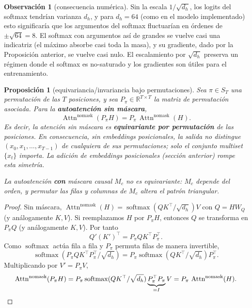 \documentclass[11pt]{report}
\newenvironment{tcolorbox}[1][]{\par\medskip\noindent\ignorespaces}{\par\medskip}
\theoremstyle{definition}
\newtheorem{observacion}[definicion]{Observación}
\theoremstyle{plain}
\newtheorem{proposicion}[definicion]{Proposición}
\numberwithin{equation}{section}
\newcommand{\R}{\mathbb{R}}
\newcommand{\softmax}{\operatorname{softmax}}
\newcommand{\Attn}{\operatorname{Attn}}
\begin{document}
\begin{observacion}[consecuencia numérica]
Sin la escala \(1/\sqrt{d_h}\), los logits del softmax tendrían varianza \(d_h\), y para \(d_h=64\) (como en el modelo implementado) esto significaría que los argumentos del softmax fluctuarían en órdenes de \(\pm\sqrt{64}=8\). El softmax con argumentos así de grandes se vuelve casi una indicatriz (el máximo absorbe casi toda la masa), y su gradiente, dado por la Proposición anterior, se vuelve casi nulo. El escalamiento por \(\sqrt{d_h}\) preserva un régimen donde el softmax es no-saturado y los gradientes son útiles para el entrenamiento.
\end{observacion}

\begin{tcolorbox}[colback=blue!8, colframe=blue!8, boxrule=0pt]
\begin{proposicion}[equivariancia/invariancia bajo permutaciones]
Sea \(\pi\in S_T\) una permutación de las \(T\) posiciones, y sea \(P_\pi\in\R^{T\times T}\) la matriz de permutación asociada. Para la \textbf{autoatención sin máscara},
\begin{equation*}
    \Attn^{\mathrm{nomask}}(P_\pi H)=P_\pi\,\Attn^{\mathrm{nomask}}(H).
\end{equation*}
Es decir, la atención sin máscara es \textbf{equivariante por permutación} de las posiciones. En consecuencia, sin embeddings posicionales, la salida no distingue \((x_0,x_1,\ldots,x_{T-1})\) de cualquiera de sus permutaciones; solo el conjunto multiset \(\{x_t\}\) importa. La adición de embeddings posicionales (sección anterior) rompe esta simetría.

La autoatención \textbf{con} máscara causal \(M_c\) no es equivariante: \(M_c\) depende del orden, y permutar las filas y columnas de \(M_c\) altera el patrón triangular.
\end{proposicion}
\end{tcolorbox}

\begin{proof}
Sin máscara, \(\Attn^{\mathrm{nomask}}(H)=\softmax(QK^\top/\sqrt{d_h})V\) con \(Q=HW_Q\) (y análogamente \(K,V\)). Si reemplazamos \(H\) por \(P_\pi H\), entonces \(Q\) se transforma en \(P_\pi Q\) (y análogamente \(K,V\)). Por tanto
\begin{equation*}
    Q'(K')^\top = P_\pi Q K^\top P_\pi^\top.
\end{equation*}
Como \(\softmax\) actúa fila a fila y \(P_\pi\) permuta filas de manera invertible,
\begin{equation*}
    \softmax(P_\pi QK^\top P_\pi^\top/\sqrt{d_h})
    =
    P_\pi\softmax(QK^\top/\sqrt{d_h})P_\pi^\top.
\end{equation*}
Multiplicando por \(V'=P_\pi V\),
\begin{equation*}
    \Attn^{\mathrm{nomask}}(P_\pi H)
    =
    P_\pi\softmax(QK^\top/\sqrt{d_h})\underbrace{P_\pi^\top P_\pi}_{=I}V
    =
    P_\pi\,\Attn^{\mathrm{nomask}}(H).\qedhere
\end{equation*}
\end{proof}
\end{document}
